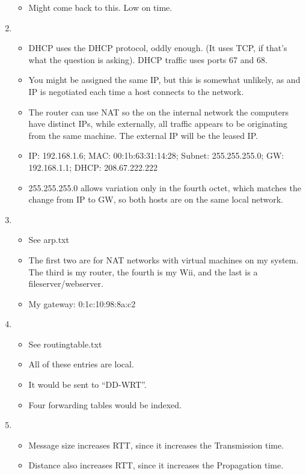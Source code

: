 \documentclass[10pt,letterpaper,titlepage]{article}
\begin{document}
\begin{enumerate}
\begin{itemize}
  \item Might come back to this. Low on time.
\end{itemize}
\item \begin{itemize}
  \item DHCP uses the DHCP protocol, oddly enough. (It uses TCP, if that's what the question is asking). DHCP traffic uses ports 67 and 68.
  \item You might be assigned the same IP, but this is somewhat unlikely, as and IP is negotiated each time a host connects to the network.
  \item The router can use NAT so the on the internal network the computers have distinct IPs, while externally, all traffic appears to be originating from the same machine. The external IP will be the leased IP.
  \item IP: 192.168.1.6; MAC: 00:1b:63:31:14:28; Subnet: 255.255.255.0; GW: 192.168.1.1; DHCP: 208.67.222.222
  \item 255.255.255.0 allows variation only in the fourth octet, which matches the change from IP to GW, so both hosts are on the same local network.
\end{itemize}
\item \begin{itemize}
\item See arp.txt
\item The first two are for NAT networks with virtual machines on my system. The third is my router, the fourth is my Wii, and the last is a fileserver/webserver.
\item My gateway: 0:1c:10:98:8a:c2 
\end{itemize}
\item \begin{itemize}
  \item See routingtable.txt
  \item All of these entries are local.
  \item It would be sent to ``DD-WRT''.
  \item Four forwarding tables would be indexed.
\end{itemize}
\item \begin{itemize}
  \item Message size increases RTT, since it increases the Transmission time.
  \item Distance also increases RTT, since it increases the Propagation time.
\end{itemize}

\end{enumerate}
\end{document}
